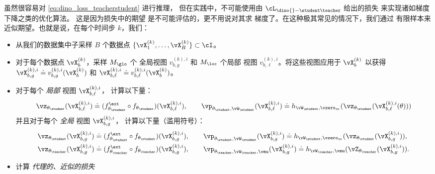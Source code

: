 \documentclass[../../book-main_zh.tex]{subfiles}
\begin{document}
虽然很容易对 \eqref{eq:dino_loss_teacherstudent} 进行推理，
但在实践中，不可能使用由 \(\cL_{\dino{}-\student\teacher}\) 给出的损失
来实现诸如梯度下降之类的优化算法。
这是因为损失中的期望
是不可能评估的，更不用说对其求
梯度了。在这种极其常见的情况下，我们通过
有限样本来近似期望。也就是说，在每个时间步 \(k\)，我们：
\begin{itemize}
    \item 从我们的数据集中子采样 \(B\) 个数据点
        \(\{\vX_{1}^{(k)}, \dots, \vX_{B}^{(k)}\} \subset \cI\)。
    \item 对于每个数据点 \(\vX_{b}^{(k)}\)，采样 \(M_{\glo}\) 个
        全局视图 \(v_{b, g}^{(k), i}\) 和 \(M_{\loc}\) 个局部
        视图 \(v_{b, \ell}^{(k), i}\)。将这些视图应用于
        \(\vX_{b}^{(k)}\) 以获得 \(\vX_{b, g}^{(k), i} \doteq
        v_{b, g}^{(k), i}(\vX_{b}^{(k)})\) 和 \(\vX_{b, \ell}^{(k),
        i} \doteq v_{b, \ell}^{(k), i}(\vX_{b}^{(k)})\)。
    \item 对于每个 \textit{局部} 视图 \(\vX_{b, \ell}^{(k), i}\)，
        计算以下量：
        \begin{equation}
            \vz_{\theta_{\student}}(\vX_{b, \ell}^{(k), i}) \doteq
            (f_{\theta_{\student}}^{\ext} \circ
            f_{\theta_{\student}})(\vX_{b, \ell}^{(k), i}), \qquad
            \vp_{\theta_{\student}, \vW_{\student}}(\vX_{b,
            \ell}^{(k), i}) \doteq h_{\vW_{\student},
            \vzero_{m}}(\vz_{\theta_{\student}}(\vX_{b, \ell}^{(k), i}(\theta)))
        \end{equation}
        并且对于每个 \textit{全局} 视图 \(\vX_{b, g}^{(k), i}\)，
        计算以下量（滥用符号）：
        \begin{align}
            &\vz_{\theta_{\student}}(\vX_{b, g}^{(k), i}) \doteq
            (f_{\theta_{\student}}^{\ext} \circ
            f_{\theta_{\student}})(\vX_{b, g}^{(k), i}), \qquad
            \vp_{\theta_{\student}, \vW_{\student}}(\vX_{b, g}^{(k),
            i}) \doteq h_{\vW_{\student},
            \vzero_{m}}(\vz_{\theta_{\student}}(\vX_{b, g}^{(k), i})), \\
            &\vz_{\theta_{\teacher}}(\vX_{b, g}^{(k), i}) \doteq
            (f_{\theta_{\teacher}}^{\ext} \circ
            f_{\theta_{\teacher}})(\vX_{b, g}^{(k), i}), \qquad
            \vp_{\theta_{\teacher}, \vW_{\teacher}, \vmu}(\vX_{b,
            g}^{(k), i}) \doteq h_{\vW_{\teacher},
            \vmu}(\vZ_{\theta_{\teacher}}(\vX_{b, g}^{(k), i})).
        \end{align}
    \item 计算 \textit{代理的、近似的损失}

\end{itemize}
\end{document}
